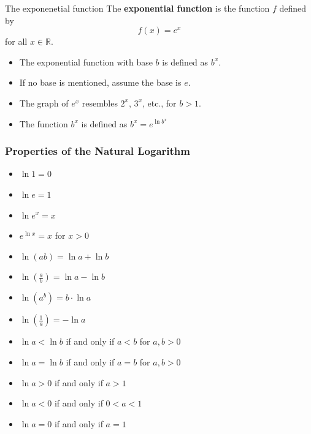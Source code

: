 \documentclass{beamer}
\begin{document}
\begin{frame}
  \begin{block}{The exponenetial function}
    The \textbf{exponential function} is the function \(f\) defined by 
    \[ f(x) = e^{x} \]
    for all \(x \in \mathbb{R}\).
  \end{block}
        \begin{itemize}
            \item The exponential function with base \( b \) is defined as \( b^x \).
            \item If no base is mentioned, assume the base is \( e \).
            \item The graph of \( e^x \) resembles \( 2^x \), \( 3^x \), etc., for \( b > 1 \).
            \item The function \(b^{x}\) is defined as \( b^{x} = e^{\ln b^{x}} \)
        \end{itemize}
\end{frame}
\begin{frame}
  \frametitle{Properties of the Natural Logarithm} 
  \begin{itemize}
    \item \(\ln 1 = 0\)
    \item \(\ln e = 1\)
    \item \(\ln e^{x} = x\)
    \item \(e^{\ln x} = x\) for \(x > 0\)
    \item \(\ln(ab) = \ln a + \ln b\)
    \item \(\ln\left(\frac{a}{b}\right) = \ln a - \ln b\)
    \item \(\ln(a^{b}) = b \cdot \ln a\)
    \item \(\ln\left(\frac{1}{a}\right) = -\ln a\)
    \item \(\ln a < \ln b\) if and only if \(a < b\) for \(a, b > 0\)
    \item \(\ln a = \ln b\) if and only if \(a = b\) for \(a, b > 0\)
    \item \(\ln a > 0\) if and only if \(a > 1\)
    \item \(\ln a < 0\) if and only if \(0 < a < 1\)
    \item \(\ln a = 0\) if and only if \(a = 1\)
  \end{itemize}
\end{frame}
\end{document}

